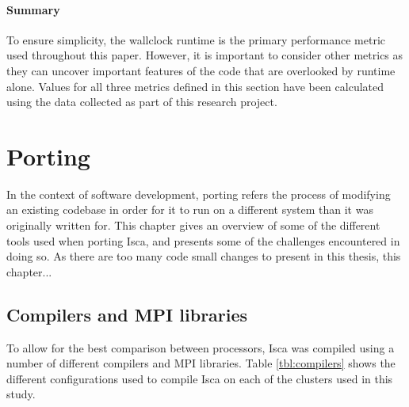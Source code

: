 \documentclass[a4paper,11pt]{report}
\begin{document}
\subsubsection{Summary}
To ensure simplicity, the wallclock runtime is the primary performance metric used throughout this paper. However, it is important to consider other metrics as they can uncover important features of the code that are overlooked by runtime alone. Values for all three metrics defined in this section have been calculated using the data collected as part of this research project. 




\let\textcircled=\pgftextcircled
\chapter{Porting}
\label{chap:baselineexp}
In the context of software development, porting refers the process of modifying an existing codebase in order for it to run on a different system than it was originally written for. This chapter gives an overview of some of the different tools used when porting Isca, and presents some of the challenges encountered in doing so. As there are too many code small changes to present in this thesis, this chapter...

\section{Compilers and MPI libraries}
To allow for the best comparison between processors, Isca was compiled using a number of different compilers and MPI libraries. Table \ref{tbl:compilers} shows the different configurations used to compile Isca on each of the clusters used in this study. 
\end{document}
